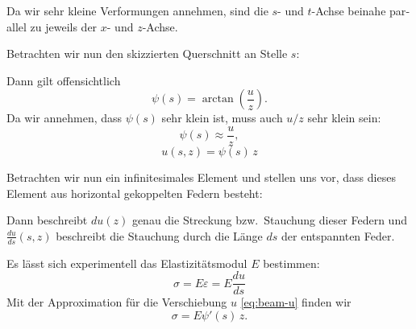 \begin{otherlanguage}{ngerman}
Da wir sehr kleine Verformungen annehmen, sind die $s$- und $t$-Achse
beinahe parallel zu jeweils der $x$- und $z$-Achse.

Betrachten wir nun den skizzierten Querschnitt an Stelle $s$:
\begin{center}
\end{center}
Dann gilt offensichtlich
\[
  \psi(s) = \arctan\left(\frac{u}{z}\right) .
\]
Da wir annehmen, dass $\psi(s)$ sehr klein ist, muss auch $u/z$ sehr klein
sein:
\[
  \psi(s) \approx \frac{u}{z} ,
\]
\begin{equation}
  \boxed{u(s,z) = \psi(s)\, z}
  \label{eq:beam-u}
\end{equation}

Betrachten wir nun ein infinitesimales Element und stellen uns vor, dass
dieses Element aus horizontal gekoppelten Federn besteht:
\begin{center}
\end{center}
Dann beschreibt $du(z)$ genau die Streckung bzw.\ Stauchung dieser Federn
und $\frac{du}{ds}(s,z)$ beschreibt die Stauchung durch die Länge $ds$ der
entspannten Feder.

Es lässt sich experimentell das Elastizitätsmodul $E$ bestimmen:
\begin{equation}
  \boxed{\sigma = E\varepsilon = E \frac{du}{ds}}
  \label{eq:beam-hooke}
\end{equation}
Mit der Approximation für die Verschiebung $u$ \eqref{eq:beam-u} finden
wir
\[
  \sigma = E \psi'(s)\, z .
\]


\end{otherlanguage}

